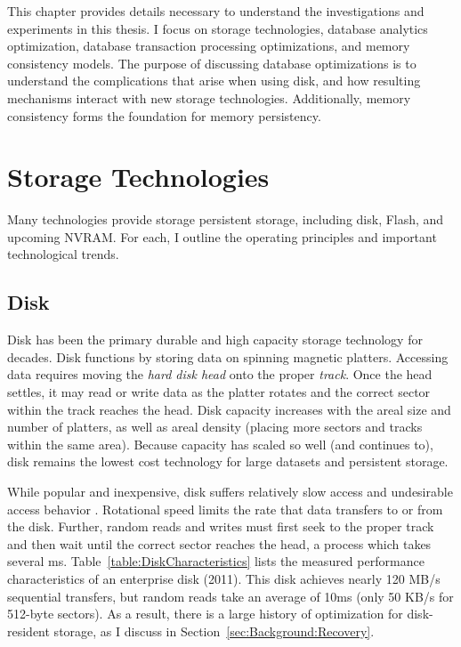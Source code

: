 This chapter provides details necessary to understand the investigations and experiments in this thesis.
I focus on storage technologies, database analytics optimization, database transaction processing optimizations, and memory consistency models.
The purpose of discussing database optimizations is to understand the complications that arise when using disk, and how resulting mechanisms interact with new storage technologies.
Additionally, memory consistency forms the foundation for memory persistency.

\section{Storage Technologies}
\label{sec:Background:Storage}

Many technologies provide storage persistent storage, including disk, Flash, and upcoming NVRAM.
For each, I outline the operating principles and important technological trends.



\subsection{Disk}
\label{sec:Background:Storage:Disk}
Disk has been the primary durable and high capacity storage technology for decades.
Disk functions by storing data on spinning magnetic platters.
Accessing data requires moving the \emph{hard disk head} onto the proper \emph{track}.
Once the head settles, it may read or write data as the platter rotates and the correct sector within the track reaches the head.
Disk capacity increases with the areal size and number of platters, as well as areal density (placing more sectors and tracks within the same area).
Because capacity has scaled so well (and continues to), disk remains the lowest cost technology for large datasets and persistent storage.

While popular and inexpensive, disk suffers relatively slow access and undesirable access behavior \cite{RuemmlerWilkes94}.
Rotational speed limits the rate that data transfers to or from the disk.
Further, random reads and writes must first seek to the proper track and then wait until the correct sector reaches the head, a process which takes several ms.
Table~\ref{table:DiskCharacteristics} lists the measured performance characteristics of an enterprise disk (2011).
This disk achieves nearly 120 MB/s sequential transfers, but random reads take an average of 10ms (only 50 KB/s for 512-byte sectors).
As a result, there is a large history of optimization for disk-resident storage, as I discuss in Section~\ref{sec:Background:Recovery}.


